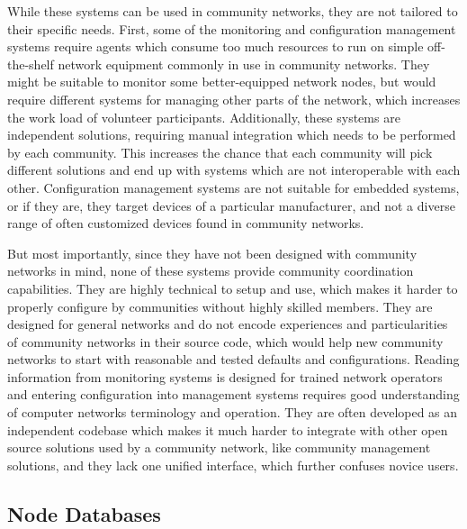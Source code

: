 \documentclass[5p,sort&compress]{elsarticle}
\begin{document}
While these systems can be used in community networks, they are not tailored to their specific needs.
First, some of the monitoring and configuration management systems require agents which consume too much resources to run on simple off-the-shelf network equipment commonly in use in community networks.
They might be suitable to monitor some better-equipped network nodes, but would require different systems for managing other parts of the network, which increases the work load of volunteer participants.
Additionally, these systems are independent solutions, requiring manual integration which needs to be performed by each community.
This increases the chance that each community will pick different solutions and end up with systems which are not interoperable with each other.
Configuration management systems are not suitable for embedded systems, or if they are, they target devices of a particular manufacturer, and not a diverse range of often customized devices found in community networks.

But most importantly, since they have not been designed with community networks in mind, none of these systems provide community coordination capabilities.
They are highly technical to setup and use, which makes it harder to properly configure by communities without highly skilled members.
They are designed for general networks and do not encode experiences and particularities of community networks in their source code, which would help new community networks to start with reasonable and tested defaults and configurations.
Reading information from monitoring systems is designed for trained network operators and entering configuration into management systems requires good understanding of computer networks terminology and operation.
They are often developed as an independent codebase which makes it much harder to integrate with other open source solutions used by a community network, like community management solutions, and they lack one unified interface, which further confuses novice users.

\subsection{Node Databases}

\newcommand{\push}{$\uparrow$}
\newcommand{\pull}{$\downarrow$}

\newcommand{\no}{$\times$}
\newcommand{\yes}{$\checkmark$}
\newcommand{\maybe}{$\circ$}

\newcommand{\static}{S}
\newcommand{\dynamic}{D}
\end{document}
